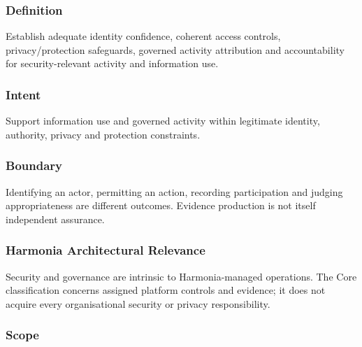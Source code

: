 \subsubsection*{Definition}

Establish adequate identity confidence, coherent access controls, privacy/\allowbreak{}protection safeguards, governed activity attribution and accountability for security-relevant activity and information use.

\subsubsection*{Intent}

Support information use and governed activity within legitimate identity, authority, privacy and protection constraints.

\subsubsection*{Boundary}

Identifying an actor, permitting an action, recording participation and judging appropriateness are different outcomes. Evidence production is not itself independent assurance.

\subsubsection*{Harmonia Architectural Relevance}

Security and governance are intrinsic to Harmonia-managed operations. The Core classification concerns assigned platform controls and evidence; it does not acquire every organisational security or privacy responsibility.

\subsubsection*{Scope}
